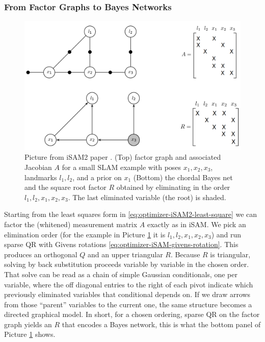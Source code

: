 \subsubsection{From Factor Graphs to Bayes Networks}
\begin{figure}[H]
    \centering
    \includegraphics[width=0.98\linewidth]{Pictures/Optimizers/iSAM2/Factor_graph_to_Bayes_network.png}
    \caption{Picture from iSAM2 paper \cite{iSAM2_paper}. (Top) factor graph and associated Jacobian $A$ for a small SLAM example with poses $x_1,x_2,x_3$, landmarks $l_1,l_2$, and a prior on $x_1$ (Bottom) the chordal Bayes net and the square root factor $R$ obtained by eliminating in the order $l_1,l_2,x_1,x_2,x_3$. The last eliminated variable (the root) is shaded. \cite{iSAM2_paper}}
    \label{fig:optimizer-iSAM2-factor-graph-to-bayes-netwrok}
\end{figure}
\noindent
Starting from the least squares form in \eqref{eq:optimizer-iSAM2-least-square} we can factor the (whitened) measurement matrix $A$ exactly as in iSAM. We pick an elimination order (for the example in Picture \ref{fig:optimizer-iSAM2-factor-graph-to-bayes-netwrok} it is $l_1,l_2,x_1,x_2,x_3$) and run sparse QR with Givens rotations \eqref{eq:optimizer-iSAM-givens-rotation}. This produces an orthogonal $Q$ and an upper triangular $R$. Because $R$ is triangular, solving by back substitution proceeds variable by variable in the chosen order. That solve can be read as a chain of simple Gaussian conditionals, one per variable, where the off diagonal entries to the right of each pivot indicate which previously eliminated variables that conditional depends on. If we draw arrows from those ``parent'' variables to the current one, the same structure becomes a directed graphical model. In short, for a chosen ordering, sparse QR on the factor graph yields an $R$ that encodes a Bayes network, this is what the bottom panel of Picture \ref{fig:optimizer-iSAM2-factor-graph-to-bayes-netwrok} shows.
